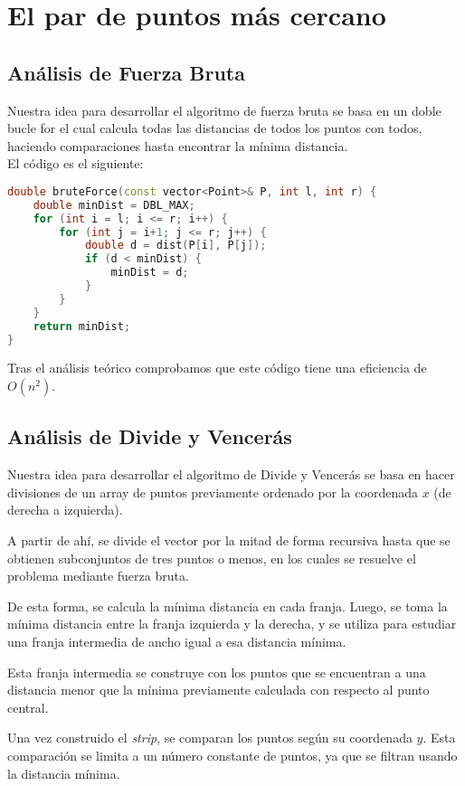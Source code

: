 \documentclass[a4paper,12pt]{article}
\begin{document}
\section{El par de puntos más cercano}
\subsection{Análisis de Fuerza Bruta}
Nuestra idea para desarrollar el algoritmo de fuerza bruta se basa en un doble bucle for el cual calcula todas 
las distancias de todos los puntos con todos, haciendo comparaciones hasta encontrar la mínima distancia. \\

El código es el siguiente:

\begin{lstlisting}[language=C++, caption={Brute Force de \textbf{``El par de puntos más cercano''}}]
double bruteForce(const vector<Point>& P, int l, int r) {
	double minDist = DBL_MAX;
	for (int i = l; i <= r; i++) {
		for (int j = i+1; j <= r; j++) {
			double d = dist(P[i], P[j]);
			if (d < minDist) {
				minDist = d;
			}
		}
	}
	return minDist;
}
\end{lstlisting}

Tras el análisis teórico comprobamos que este código tiene una eficiencia de $O(n^2)$.

\subsection{Análisis de Divide y Vencerás}
Nuestra idea para desarrollar el algoritmo de Divide y Vencerás se basa en hacer divisiones 
de un array de puntos previamente ordenado por la coordenada $x$ (de derecha a izquierda). 

A partir de ahí, se divide el vector por la mitad de forma recursiva hasta que se obtienen subconjuntos 
de tres puntos o menos, en los cuales se resuelve el problema mediante fuerza bruta. 

De esta forma, se calcula la mínima distancia en cada franja. Luego, se toma la mínima distancia entre 
la franja izquierda y la derecha, y se utiliza para estudiar una franja intermedia de ancho igual 
a esa distancia mínima.

Esta franja intermedia se construye con los puntos que se encuentran a una distancia menor que la mínima 
previamente calculada con respecto al punto central. 

Una vez construido el \textit{strip}, se comparan los puntos según su coordenada $y$. 
Esta comparación se limita a un número constante de puntos, ya que se filtran usando la distancia mínima. 
\end{document}
